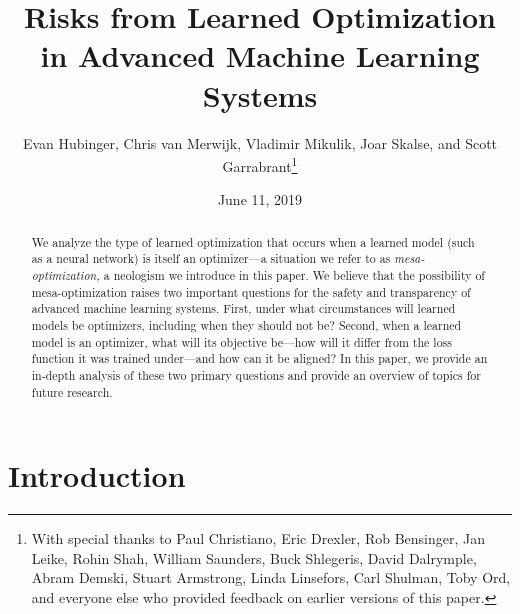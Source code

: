 \documentclass[
  onecolumn,
  natbib,
]{miri-tech-article}
\begin{document}
\title{Risks from Learned Optimization \\ in Advanced Machine Learning Systems}
\author{Evan Hubinger, Chris van Merwijk, Vladimir Mikulik, Joar Skalse, and Scott Garrabrant\thanks{With special thanks to Paul Christiano, Eric Drexler, Rob Bensinger, Jan Leike, Rohin Shah, William Saunders, Buck Shlegeris, David Dalrymple, Abram Demski, Stuart Armstrong, Linda Linsefors, Carl Shulman, Toby Ord, and everyone else who provided feedback on earlier versions of this paper.}}

\date{June 11, 2019}


\maketitle

\begin{abstract}
We analyze the type of learned optimization that occurs when a learned model (such as a neural network) is itself an optimizer---a situation we refer to as \textit{mesa-optimization,} a neologism we introduce in this paper. We believe that the possibility of mesa-optimization raises two important questions for the safety and transparency of advanced machine learning systems. First, under what circumstances will learned models be optimizers, including when they should not be? Second, when a learned model is an optimizer, what will its objective be---how will it differ from the loss function it was trained under---and how can it be aligned? In this paper, we provide an in-depth analysis of these two primary questions and provide an overview of topics for future research.
\end{abstract}

\tableofcontents

\section{Introduction}
\label{sec:1}
\end{document}
